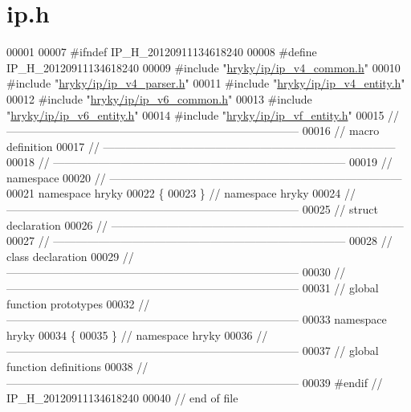 \hypertarget{ip_8h_source}{\section{ip.\-h}
}

\begin{DoxyCode}
00001 
00007 \textcolor{preprocessor}{#ifndef IP\_H\_20120911134618240}
00008 \textcolor{preprocessor}{}\textcolor{preprocessor}{#define IP\_H\_20120911134618240}
00009 \textcolor{preprocessor}{}\textcolor{preprocessor}{#include "\hyperlink{ip__v4__common_8h}{hryky/ip/ip_v4_common.h}"}
00010 \textcolor{preprocessor}{#include "\hyperlink{ip__v4__parser_8h}{hryky/ip/ip_v4_parser.h}"}
00011 \textcolor{preprocessor}{#include "\hyperlink{ip__v4__entity_8h}{hryky/ip/ip_v4_entity.h}"}
00012 \textcolor{preprocessor}{#include "\hyperlink{ip__v6__common_8h}{hryky/ip/ip_v6_common.h}"}
00013 \textcolor{preprocessor}{#include "\hyperlink{ip__v6__entity_8h}{hryky/ip/ip_v6_entity.h}"}
00014 \textcolor{preprocessor}{#include "\hyperlink{ip__vf__entity_8h}{hryky/ip/ip_vf_entity.h}"}
00015 \textcolor{comment}{//
      ------------------------------------------------------------------------------}
00016 \textcolor{comment}{// macro definition}
00017 \textcolor{comment}{//
      ------------------------------------------------------------------------------}
00018 \textcolor{comment}{//
      ------------------------------------------------------------------------------}
00019 \textcolor{comment}{// namespace}
00020 \textcolor{comment}{//
      ------------------------------------------------------------------------------}
00021 \textcolor{keyword}{namespace }hryky
00022 \{
00023 \} \textcolor{comment}{// namespace hryky}
00024 \textcolor{comment}{//
      ------------------------------------------------------------------------------}
00025 \textcolor{comment}{// struct declaration}
00026 \textcolor{comment}{//
      ------------------------------------------------------------------------------}
00027 \textcolor{comment}{//
      ------------------------------------------------------------------------------}
00028 \textcolor{comment}{// class declaration}
00029 \textcolor{comment}{//
      ------------------------------------------------------------------------------}
00030 \textcolor{comment}{//
      ------------------------------------------------------------------------------}
00031 \textcolor{comment}{// global function prototypes}
00032 \textcolor{comment}{//
      ------------------------------------------------------------------------------}
00033 \textcolor{keyword}{namespace }hryky
00034 \{
00035 \} \textcolor{comment}{// namespace hryky}
00036 \textcolor{comment}{//
      ------------------------------------------------------------------------------}
00037 \textcolor{comment}{// global function definitions}
00038 \textcolor{comment}{//
      ------------------------------------------------------------------------------}
00039 \textcolor{preprocessor}{#endif // IP\_H\_20120911134618240}
00040 \textcolor{preprocessor}{}\textcolor{comment}{// end of file}
\end{DoxyCode}
